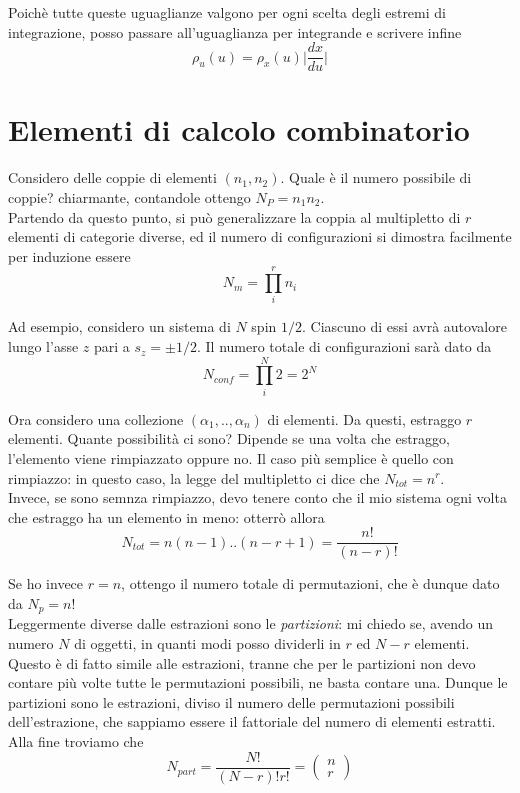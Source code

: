 \documentclass{report}
\begin{document}
Poichè tutte queste uguaglianze valgono per ogni scelta degli estremi di integrazione, posso passare all'uguaglianza per integrande e scrivere infine
\begin{equation}
    \rho_u(u) = \rho_x(u)\biggr| \frac{dx}{du}\biggr|
\end{equation}

\section{Elementi di calcolo combinatorio}

Considero delle coppie di elementi $(n_1, n_2)$. Quale è il numero possibile di coppie? chiarmante, contandole ottengo $N_P = n_1n_2$. \\
Partendo da questo punto, si può generalizzare la coppia al multipletto di $r$ elementi di categorie diverse, ed il numero di configurazioni si dimostra facilmente per induzione essere 
\begin{equation}
    N_m = \prod_i^r n_i
\end{equation}

Ad esempio, considero un sistema di $N$ spin $1/2$. Ciascuno di essi avrà autovalore lungo l'asse $z$ pari a $s_z = \pm 1/2$. Il numero totale di configurazioni sarà dato da 
\begin{equation}
    N_{conf} = \prod_i^N 2 = 2^N
\end{equation}

Ora considero una collezione $(\alpha_1, .., \alpha_n)$ di elementi. Da questi, estraggo $r$ elementi. Quante possibilità ci sono? Dipende se una volta che estraggo, l'elemento viene rimpiazzato oppure no. Il caso più semplice è quello con rimpiazzo: in questo caso, la legge del multipletto ci dice che $N_{tot} = n^r$. \\

Invece, se sono semnza rimpiazzo, devo tenere conto che il mio sistema ogni volta che estraggo ha un elemento in meno: otterrò allora
\begin{equation}
    N_{tot} = n(n-1)..(n-r+1) = \frac{n!}{(n-r)!}
\end{equation}

Se ho invece $r=n$, ottengo il numero totale di permutazioni, che è dunque dato da $N_p = n!$\\

Leggermente diverse dalle estrazioni sono le \emph{partizioni}: mi chiedo se, avendo un numero $N$ di oggetti, in quanti modi posso dividerli in $r$ ed $N-r$ elementi. Questo è di fatto simile alle estrazioni, tranne che per le partizioni non devo contare più volte tutte le permutazioni possibili, ne basta contare una. Dunque le partizioni sono le estrazioni, diviso il numero delle permutazioni possibili dell'estrazione, che sappiamo essere il fattoriale del numero di elementi estratti. Alla fine troviamo che
\begin{equation}
    N_{part} = \frac{N!}{(N-r)!r!} = \begin{pmatrix}
        n \\ r
    \end{pmatrix}
\end{equation}
\end{document}
